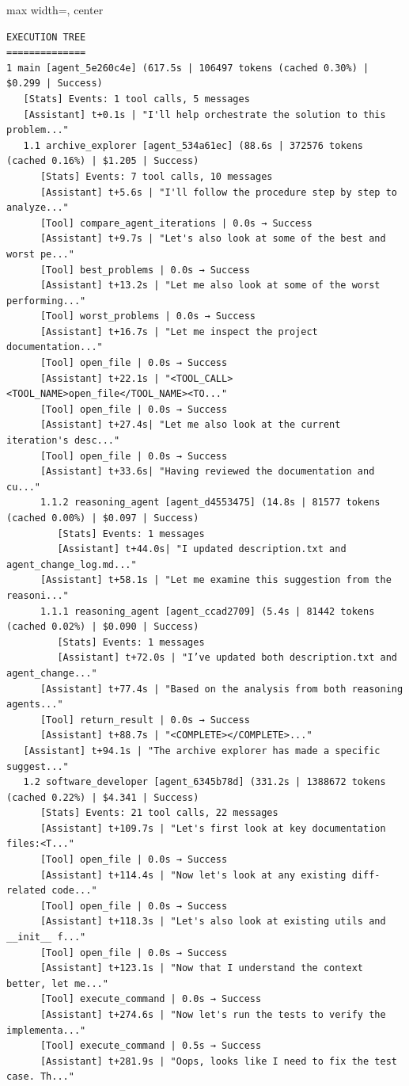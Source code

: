 {
\begin{adjustbox}{max width=\linewidth, center}
\begin{tracebox}
\begin{verbatim}
EXECUTION TREE
==============
1 main [agent_5e260c4e] (617.5s | 106497 tokens (cached 0.30%) | $0.299 | Success)
   [Stats] Events: 1 tool calls, 5 messages
   [Assistant] t+0.1s | "I'll help orchestrate the solution to this problem..."
   1.1 archive_explorer [agent_534a61ec] (88.6s | 372576 tokens (cached 0.16%) | $1.205 | Success)
      [Stats] Events: 7 tool calls, 10 messages
      [Assistant] t+5.6s | "I'll follow the procedure step by step to analyze..."
      [Tool] compare_agent_iterations | 0.0s → Success
      [Assistant] t+9.7s | "Let's also look at some of the best and worst pe..."
      [Tool] best_problems | 0.0s → Success
      [Assistant] t+13.2s | "Let me also look at some of the worst performing..."
      [Tool] worst_problems | 0.0s → Success
      [Assistant] t+16.7s | "Let me inspect the project documentation..."
      [Tool] open_file | 0.0s → Success
      [Assistant] t+22.1s | "<TOOL_CALL><TOOL_NAME>open_file</TOOL_NAME><TO..."
      [Tool] open_file | 0.0s → Success
      [Assistant] t+27.4s| "Let me also look at the current iteration's desc..."
      [Tool] open_file | 0.0s → Success
      [Assistant] t+33.6s| "Having reviewed the documentation and cu..."
      1.1.2 reasoning_agent [agent_d4553475] (14.8s | 81577 tokens (cached 0.00%) | $0.097 | Success)
         [Stats] Events: 1 messages
         [Assistant] t+44.0s| "I updated description.txt and agent_change_log.md..."
      [Assistant] t+58.1s | "Let me examine this suggestion from the reasoni..."
      1.1.1 reasoning_agent [agent_ccad2709] (5.4s | 81442 tokens (cached 0.02%) | $0.090 | Success)
         [Stats] Events: 1 messages
         [Assistant] t+72.0s | "I’ve updated both description.txt and agent_change..."
      [Assistant] t+77.4s | "Based on the analysis from both reasoning agents..."
      [Tool] return_result | 0.0s → Success
      [Assistant] t+88.7s | "<COMPLETE></COMPLETE>..."
   [Assistant] t+94.1s | "The archive explorer has made a specific suggest..."
   1.2 software_developer [agent_6345b78d] (331.2s | 1388672 tokens (cached 0.22%) | $4.341 | Success)
      [Stats] Events: 21 tool calls, 22 messages
      [Assistant] t+109.7s | "Let's first look at key documentation files:<T..."
      [Tool] open_file | 0.0s → Success
      [Assistant] t+114.4s | "Now let's look at any existing diff-related code..."
      [Tool] open_file | 0.0s → Success
      [Assistant] t+118.3s | "Let's also look at existing utils and __init__ f..."
      [Tool] open_file | 0.0s → Success
      [Assistant] t+123.1s | "Now that I understand the context better, let me..."
      [Tool] execute_command | 0.0s → Success
      [Assistant] t+274.6s | "Now let's run the tests to verify the implementa..."
      [Tool] execute_command | 0.5s → Success
      [Assistant] t+281.9s | "Oops, looks like I need to fix the test case. Th..."


\end{verbatim}
\end{tracebox}
\end{adjustbox}}
